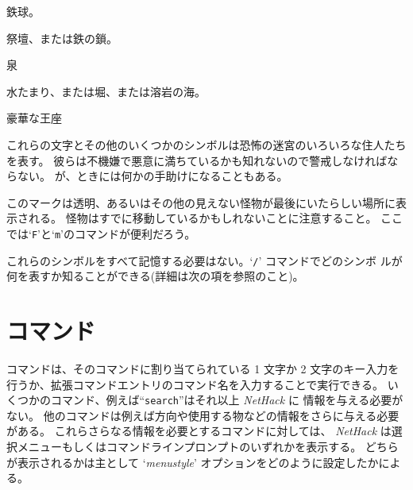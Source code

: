 鉄球。
\item[\tb{_}]
祭壇、または鉄の鎖。
\item[\tb{\{}]
泉
\item[\tb{\}}]
水たまり、または堀、または溶岩の海。
\item[\tb{$\backslash$}]
豪華な王座
\item[\tb{a-zA-Z およびその他のシンボル}]
これらの文字とその他のいくつかのシンボルは恐怖の迷宮のいろいろな住人たちを表す。
彼らは不機嫌で悪意に満ちているかも知れないので警戒しなければならない。
が、ときには何かの手助けになることもある。
\item[\tb{I}]
このマークは透明、あるいはその他の見えない怪物が最後にいたらしい場所に表示される。
怪物はすでに移動しているかもしれないことに注意すること。
ここでは`{\tt F}'と`{\tt m}'のコマンドが便利だろう。

\elist
これらのシンボルをすべて記憶する必要はない。`{\tt /}' コマンドでどのシンボ
ルが何を表すか知ることができる(詳細は次の項を参照のこと)。

\section{コマンド}

コマンドは、そのコマンドに割り当てられている 1 文字か 2 文字のキー入力を
行うか、拡張コマンドエントリのコマンド名を入力することで実行できる。
いくつかのコマンド、例えば``{\tt search}''はそれ以上 {\it NetHack\/} に
情報を与える必要がない。
他のコマンドは例えば方向や使用する物などの情報をさらに与える必要がある。
これらさらなる情報を必要とするコマンドに対しては、
{\it NetHack\/} は選択メニューもしくはコマンドラインプロンプトのいずれかを表示する。
どちらが表示されるかは主として
`{\it menustyle\/}'
オプションをどのように設定したかによる。

